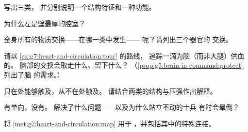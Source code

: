 \begin{exercise}[$\star$]\label{exo:g7:heart-and-circulation:4}
写出三类，
并分别说明一个结构特征和一种功能。
\end{exercise}

\begin{exercise}[$\star$]\label{exo:g7:heart-and-circulation:5}
为什么左是壁最厚的腔室？
\end{exercise}

\begin{exercise}[$\star$]\label{exo:g7:heart-and-circulation:6}
全身所有的物质交换——在哪一类中发生——
呢？请列出三个器官的
交换。
\end{exercise}

\begin{exercise}[$\star\star$]\label{exo:g7:heart-and-circulation:7}
请以 \cref{ex:g7:heart-and-circulation:tour} 的路线，
追踪一滴为脑（而非大腿）供血的。
脑部的交换会取走什么、留下什么？
（\cref{prop:g5:brain-in-command:protect} 列出了脑
的需求。）
\end{exercise}

\begin{exercise}[$\star\star$]\label{exo:g7:heart-and-circulation:8}
只在处能够触及，从不在处触及。
请结合两类的结构与压强作出解释。
\end{exercise}

\begin{exercise}[$\star\star$]\label{exo:g7:heart-and-circulation:9}
有单向，没有。
解决了什么问题——以及为什么站立不动的士兵
有时会晕倒？
\end{exercise}

\begin{exercise}[$\star\star$]\label{exo:g7:heart-and-circulation:10}
将 \cref{met:g7:heart-and-circulation:map} 用于
，并包括其中的特殊连接。
\end{exercise}

